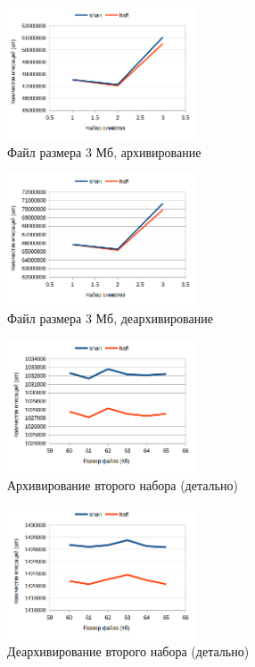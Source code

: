 \documentclass[a4paper,12pt]{article} %
\begin{document}
    \begin{figure}[!htb]
        \caption{Файл размера 3 Мб, архивирование}
        \centering
        \includegraphics[width=0.5\textwidth]{graphs/3/c}
    \end{figure}
    \begin{figure}[!htb]
        \caption{Файл размера 3 Мб, деархивирование}
        \centering
        \includegraphics[width=0.5\textwidth]{graphs/3/d}
    \end{figure}
    \begin{figure}[!htb]
        \caption{Архивирование второго набора (детально)}
        \centering
        \includegraphics[width=0.5\textwidth]{graphs/2/2_c_detailed}
    \end{figure}
    \begin{figure}[!htb]
        \caption{Деархивирование второго набора (детально)}
        \centering
        \includegraphics[width=0.5\textwidth]{graphs/2/2_d_detailed}
    \end{figure}
\end{document}
